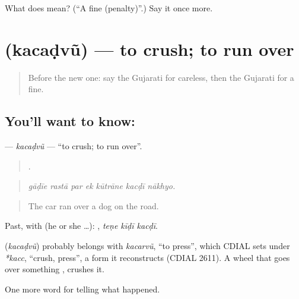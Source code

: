 \begin{tcolorbox}[breakable,colback=teal!4,colframe=teal!35!black,title={Before you move on}]
What does  mean? (\textquotedblleft{}A fine (penalty)\textquotedblright{}.) Say it once more.
\end{tcolorbox}
\section[\texorpdfstring{\gu{કચડવું} (kacaḍvũ)}{કચડવું (kacaḍvũ)}]{ (kacaḍvũ) — to crush; to run over}

\label{lesson:GU-C295-kacadvu}



\begin{quote}
Before the new one: say the Gujarati for careless, then the Gujarati for a fine.
\end{quote}

\subsection*{You'll want to know: }
\textbf{} — \emph{kacaḍvũ} — \textquotedblleft{}to crush; to run over\textquotedblright{}.

\begin{quote}
      .
\end{quote}

\begin{quote}
\emph{gāḍīe rastā par ek kūtrāne kacḍī nākhyo.}
\end{quote}

\begin{quote}
The car ran over a dog on the road.
\end{quote}

Past, with  (he or she …):   , \emph{teṇe kīḍī kacḍī}.

\begin{cousinweb}
\textbf{} (\emph{kacaḍvũ}) probably belongs with \emph{kacarvũ}, \textquotedblleft{}to press\textquotedblright{}, which CDIAL sets under \emph{*kacc}, \textquotedblleft{}crush, press\textquotedblright{}, a form it reconstructs (CDIAL 2611). A wheel that goes over something \textbf{  }, crushes it.
\end{cousinweb}

\begin{grammarlens}[title={What you've built}]
One more word for telling what happened.
\end{grammarlens}

